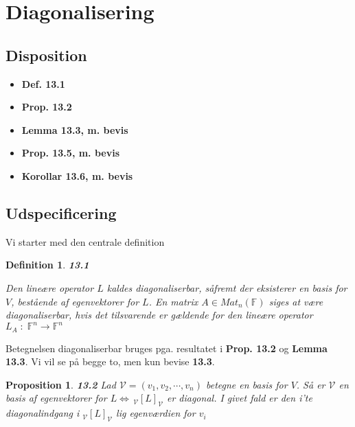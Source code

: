 \documentclass[paper=a4, fontsize=11pt]{scrartcl} %
\newtheorem*{definition}{Definition}
\newtheorem*{proposition}{Proposition}
\newenvironment{cstmproposition}[1]{\begin{proposition} {\normalfont\textbf{#1}}}{\end{proposition}}
\newenvironment{cstmdefinition}[1]{\begin{definition} {\normalfont\textbf{#1}}}{\end{definition}}
\begin{document}
			\newpage
			
			\section{Diagonalisering}
			
			\subsection{Disposition}
			
			\begin{itemize}
				\item \textbf{Def. 13.1}
				\item \textbf{Prop. 13.2}
				\item \textbf{Lemma 13.3, m. bevis}
				\item \textbf{Prop. 13.5, m. bevis}
				\item \textbf{Korollar 13.6, m. bevis}
			\end{itemize}
			
			\subsection{Udspecificering}
			
			
			Vi starter med den centrale definition
			
			\begin{cstmdefinition}{13.1}
				
				Den lineære operator $L$ kaldes diagonaliserbar, såfremt der eksisterer en basis for $V$, bestående af egenvektorer for $L$. En matrix $A \in Mat_n(\mathbb{F})$ siges at være diagonaliserbar, hvis det tilsvarende er gældende for den lineære operator $L_A \; : \; \mathbb{F}^n \rightarrow \mathbb{F}^n$
				
				
			\end{cstmdefinition}
			
			Betegnelsen diagonaliserbar bruges pga. resultatet i \textbf{Prop. 13.2} og \textbf{Lemma 13.3}. Vi vil se på begge to, men kun bevise \textbf{13.3}.
			
			\begin{cstmproposition}{13.2}
				Lad $\mathcal{V} = (v_1,v_2,\cdots,v_n)$ betegne en basis for $V$. Så er $\mathcal{V}$ en basis af egenvektorer for $L \Leftrightarrow \, _{\mathcal{V}}[L]_{\mathcal{V}}$ er diagonal. I givet fald er den i'te diagonalindgang i $_{\mathcal{V}}[L]_{\mathcal{V}}$ lig egenværdien for $v_i$   
				
			\end{cstmproposition}
			
\end{document}
